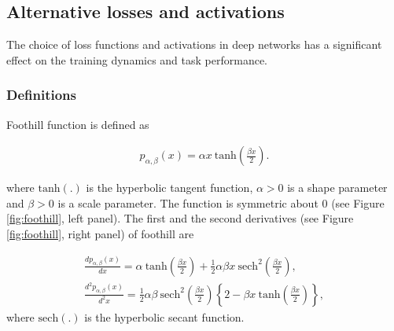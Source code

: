 \subsection{Alternative losses and activations}

The choice of loss functions and activations in deep networks has a significant effect on the training dynamics and task performance.

\subsubsection{Definitions}

Foothill function \citep{belbahri2019foothill} is defined as

\begin{align}
    p_{\alpha,\beta}(x) = \alpha x~ \mathrm{tanh}\left( \frac{\beta x}{2} \right).
    \label{eq:reswish}
\end{align}

where $\mathrm{tanh}(.)$ is the hyperbolic tangent function, $\alpha > 0$ is a shape parameter and $\beta > 0$ is a scale parameter. %
The function is symmetric about $0$ (see Figure \ref{fig:foothill}, left panel). The first and the second derivatives (see Figure \ref{fig:foothill}, right panel) of foothill are 

\begin{align*}
    \frac{dp_{\alpha,\beta}(x)}{dx} = \alpha ~ \mathrm{tanh}\left( \frac{\beta x}{2} \right) + \frac{1}{2} \alpha \beta x ~ \mathrm{sech}^2\left( \frac{\beta x}{2} \right), \\
     \frac{d^2p_{\alpha,\beta}(x)}{d^2x} = \frac{1}{2} \alpha \beta~ \mathrm{sech}^2\left( \frac{\beta x}{2} \right) \left\{  2 - \beta x ~ \mathrm{tanh}\left( \frac{\beta x}{2} \right) \right\},
\end{align*}
where $\mathrm{sech}(.)$ is the hyperbolic secant function.


